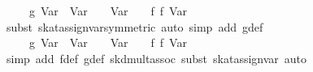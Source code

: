 \begin{isabellebody}
\ {}{}{}{}\ {}\ {}\ {}{}\ g\ {}Var\ {}{}\ {}Var\ {}{}{}\ {}\ {}{}\ Var\ {}{}\ {}\ {}{}\ f\ {}f\ {}Var\ {}{}{}{}\isanewline
\ \ \ \ \isamarkupfalse%
\ {}subst\ skat{}assign{}{}var{}symmetric{}{}\ {}auto\ simp\ add{}\ g{}def{}\isanewline
\ \ \isamarkupfalse%
\ \isamarkupfalse%
\ {}{}{}{}\ {}\ {}\ {}{}\ g\ {}Var\ {}{}\ {}Var\ {}{}{}\ {}\ {}{}\ Var\ {}{}\ {}\ {}{}\ f\ {}f\ {}Var\ {}{}{}{}\isanewline
\ \ \ \ \isamarkupfalse%
\ {}simp\ add{}\ f{}def\ g{}def\ skd{}mult{}assoc{}\ subst\ skat{}assign{}{}var{}\ auto{}\isanewline

\end{isabellebody}
